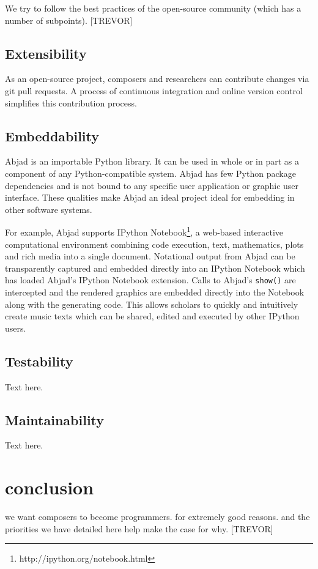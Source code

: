 \documentclass{article}
\begin{document}
We try to follow the best practices of the open-source community (which has a
number of subpoints). [TREVOR]

\subsection{Extensibility}

As an open-source project, composers and researchers can contribute changes via
git pull requests. A process of continuous integration and online version
control simplifies this contribution process. 

\subsection{Embeddability}

Abjad is an importable Python library. It can be used in whole or in part as a
component of any Python-compatible system. Abjad has few Python package
dependencies and is not bound to any specific user application or graphic user
interface. These qualities make Abjad an ideal project ideal for embedding in
other software systems.

For example, Abjad supports IPython
Notebook\footnote{http://ipython.org/notebook.html}, a web-based interactive
computational environment combining code execution, text, mathematics, plots
and rich media into a single document. Notational output from Abjad can be
transparently captured and embedded directly into an IPython Notebook which has
loaded Abjad's IPython Notebook extension. Calls to Abjad's \texttt{show()} are
intercepted and the rendered graphics are embedded directly into the Notebook
along with the generating code. This allows scholars to quickly and intuitively
create music texts which can be shared, edited and executed by other IPython
users.

\subsection{Testability}

Text here.

\subsection{Maintainability}

Text here.

\section{conclusion}

we want composers to become programmers. for extremely good reasons. and the
priorities we have detailed here help make the case for why. [TREVOR]


\end{document}
